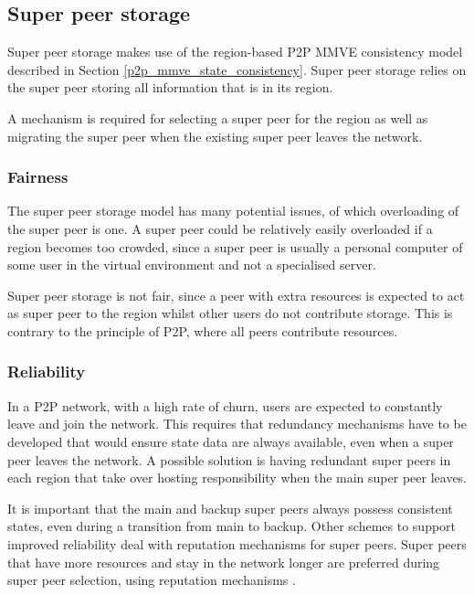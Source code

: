 \subsection{Super peer storage}
\label{super_peer_storage}

Super peer storage makes use of the region-based P2P MMVE consistency model described in Section \ref{p2p_mmve_state_consistency}. Super peer storage relies on the super peer storing all information that is in its region.

A mechanism is required for selecting a super peer for the region as well as migrating the super peer when the existing super peer leaves the network.

\subsubsection{Fairness}
The super peer storage model has many potential issues, of which overloading of the super peer is one. A super peer could be relatively easily overloaded if a region becomes too crowded, since a super peer is usually a personal computer of some user in the virtual environment and not a specialised server.

Super peer storage is not fair, since a peer with extra resources is expected to act as super peer to the region whilst other users do not contribute storage. This is contrary to the principle of P2P, where all peers contribute resources.

\subsubsection{Reliability}
\label{super_peer_storage_reliability}

In a P2P network, with a high rate of churn, users are expected to constantly leave and join the network. This requires that redundancy mechanisms have to be developed that would ensure state data are always available, even when a super peer leaves the network. A possible solution is having redundant super peers in each region that take over hosting responsibility when the main super peer leaves.

It is important that the main and backup super peers always possess consistent states, even during a transition from main to backup. Other schemes to support improved reliability deal with reputation mechanisms for super peers. Super peers that have more resources and stay in the network longer are preferred during super peer selection, using reputation mechanisms \cite{fan_mediator_paper}.

